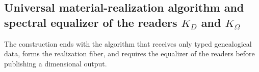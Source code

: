 
\endgroup
\begingroup
\let\chapter\section
\let\section\subsection
\let\subsection\subsubsection
\let\subsubsection\paragraph
\let\clearpage\relax

\endgroup

\section{Universal material-realization algorithm and spectral equalizer of the readers \(K_D\) and \(K_\Omega\)}
The construction ends with the algorithm that receives only typed
genealogical data, forms the realization fiber, and requires the equalizer of
the readers before publishing a dimensional output.

